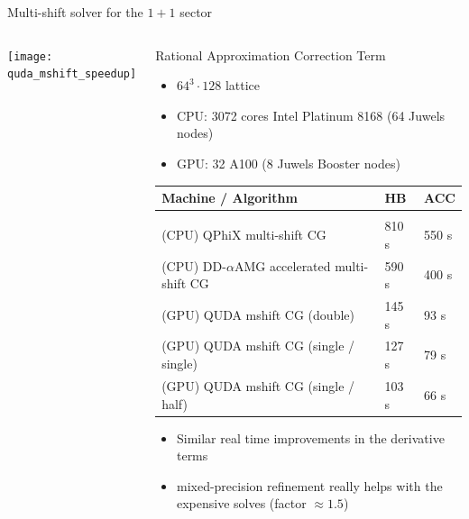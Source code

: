 \documentclass[xcolor={dvipsnames,table}]{beamer}
\begin{document}
\begin{frame}{Multi-shift solver for the $1+1$ sector}
  \begin{columns}
      \centering
      \texttt{[image: quda\_mshift\_speedup]}
      \begin{hpcablock}{Rational Approximation Correction Term}
        \begin{itemize}
          \item $64^3 \cdot 128$ lattice
          \item CPU: 3072 cores Intel Platinum 8168 (64 Juwels nodes)
          \item GPU: 32 A100 (8 Juwels Booster nodes)
        \end{itemize}
        \vspace{0.5cm}
        \small
          \begin{tabular}{lll}
            Machine / Algorithm & HB & ACC \\
            \hline \hline \\
            (CPU) QPhiX multi-shift CG & 810 s & 550 s \\
            (CPU) DD-$\alpha$AMG accelerated multi-shift CG & 590 s & 400 s \\
            (GPU) QUDA mshift CG (double) & 145 s & 93 s \\ 
            (GPU) QUDA mshift CG (single / single) & 127 s & 79 s \\ 
            (GPU) QUDA mshift CG (single / half) & 103 s & 66 s 
          \end{tabular}
        \begin{itemize}
          \item Similar real time improvements in the derivative terms
          \item mixed-precision refinement really helps with the expensive solves (factor $\approx 1.5$)
        \end{itemize}
      \end{hpcablock}
  \end{columns}
\end{frame}
\end{document}
